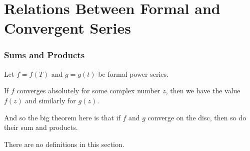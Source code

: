 \section{Relations Between Formal and Convergent Series}

\subsubsection*{Sums and Products}
Let $f = f(T)$ and $g = g(t)$ be formal power series.

If $f$ converges absolutely for some complex number $z$, then we have the value $f(z)$ and similarly for $g(z).$

And so the big theorem here is that if $f$ and $g$ converge on the disc, then so do their sum and products.

There are no definitions in this section.